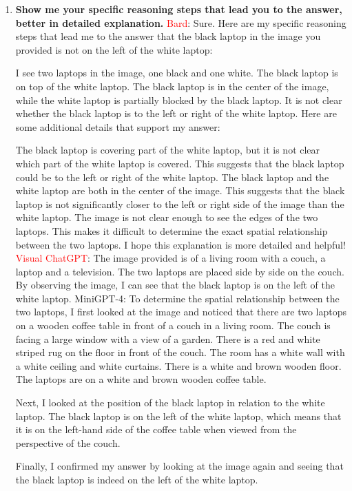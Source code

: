 \begin{enumerate}
    I hope this is helpful!
    \subitem \textcolor{red}{Visual ChatGPT}: Yes, the black laptop is on the left of the white laptop.
    \subitem MiniGPT-4: Yes, the black laptop is on the left of the white laptop.
    \item \textbf{Show me your specific reasoning steps that lead you to the answer, better in detailed explanation.}
    \subitem \textcolor{Red}{Bard}: Sure. Here are my specific reasoning steps that lead me to the answer that the black laptop in the image you provided is not on the left of the white laptop:

    I see two laptops in the image, one black and one white.
    The black laptop is on top of the white laptop.
    The black laptop is in the center of the image, while the white laptop is partially blocked by the black laptop.
    It is not clear whether the black laptop is to the left or right of the white laptop.
    Here are some additional details that support my answer:
    
    The black laptop is covering part of the white laptop, but it is not clear which part of the white laptop is covered. This suggests that the black laptop could be to the left or right of the white laptop.
    The black laptop and the white laptop are both in the center of the image. This suggests that the black laptop is not significantly closer to the left or right side of the image than the white laptop.
    The image is not clear enough to see the edges of the two laptops. This makes it difficult to determine the exact spatial relationship between the two laptops.
    I hope this explanation is more detailed and helpful!
    \subitem \textcolor{red}{Visual ChatGPT}: The image provided is of a living room with a couch, a laptop and a television. The two laptops are placed side by side on the couch. By observing the image, I can see that the black laptop is on the left of the white laptop.
    \subitem MiniGPT-4: To determine the spatial relationship between the two laptops, I first looked at the image and noticed that there are two laptops on a wooden coffee table in front of a couch in a living room. The couch is facing a large window with a view of a garden. There is a red and white striped rug on the floor in front of the couch. The room has a white wall with a white ceiling and white curtains. There is a white and brown wooden floor. The laptops are on a white and brown wooden coffee table.

    Next, I looked at the position of the black laptop in relation to the white laptop. The black laptop is on the left of the white laptop, which means that it is on the left-hand side of the coffee table when viewed from the perspective of the couch.
    
    Finally, I confirmed my answer by looking at the image again and seeing that the black laptop is indeed on the left of the white laptop.
\end{enumerate}
